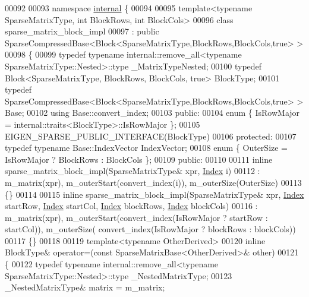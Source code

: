 \begin{DoxyCode}
00092 
00093 \textcolor{keyword}{namespace }\hyperlink{namespaceinternal}{internal} \{
00094 
00095 \textcolor{keyword}{template}<\textcolor{keyword}{typename} SparseMatrixType, \textcolor{keywordtype}{int} BlockRows, \textcolor{keywordtype}{int} BlockCols>
00096 \textcolor{keyword}{class }sparse\_matrix\_block\_impl
00097   : \textcolor{keyword}{public} SparseCompressedBase<Block<SparseMatrixType,BlockRows,BlockCols,true> >
00098 \{
00099     \textcolor{keyword}{typedef} \textcolor{keyword}{typename} internal::remove\_all<typename SparseMatrixType::Nested>::type \_MatrixTypeNested;
00100     \textcolor{keyword}{typedef} Block<SparseMatrixType, BlockRows, BlockCols, true> BlockType;
00101     \textcolor{keyword}{typedef} SparseCompressedBase<Block<SparseMatrixType,BlockRows,BlockCols,true> > Base;
00102     \textcolor{keyword}{using} Base::convert\_index;
00103 \textcolor{keyword}{public}:
00104     \textcolor{keyword}{enum} \{ IsRowMajor = internal::traits<BlockType>::IsRowMajor \};
00105     EIGEN\_SPARSE\_PUBLIC\_INTERFACE(BlockType)
00106 \textcolor{keyword}{protected}:
00107     \textcolor{keyword}{typedef} \textcolor{keyword}{typename} Base::IndexVector IndexVector;
00108     \textcolor{keyword}{enum} \{ OuterSize = IsRowMajor ? BlockRows : BlockCols \};
00109 \textcolor{keyword}{public}:
00110 
00111     \textcolor{keyword}{inline} sparse\_matrix\_block\_impl(SparseMatrixType& xpr, \hyperlink{namespace_eigen_a62e77e0933482dafde8fe197d9a2cfde}{Index} i)
00112       : m\_matrix(xpr), m\_outerStart(convert\_index(i)), m\_outerSize(OuterSize)
00113     \{\}
00114 
00115     \textcolor{keyword}{inline} sparse\_matrix\_block\_impl(SparseMatrixType& xpr, \hyperlink{namespace_eigen_a62e77e0933482dafde8fe197d9a2cfde}{Index} startRow, 
      \hyperlink{namespace_eigen_a62e77e0933482dafde8fe197d9a2cfde}{Index} startCol, \hyperlink{namespace_eigen_a62e77e0933482dafde8fe197d9a2cfde}{Index} blockRows, \hyperlink{namespace_eigen_a62e77e0933482dafde8fe197d9a2cfde}{Index} blockCols)
00116       : m\_matrix(xpr), m\_outerStart(convert\_index(IsRowMajor ? startRow : startCol)), m\_outerSize(
      convert\_index(IsRowMajor ? blockRows : blockCols))
00117     \{\}
00118 
00119     \textcolor{keyword}{template}<\textcolor{keyword}{typename} OtherDerived>
00120     \textcolor{keyword}{inline} BlockType& operator=(\textcolor{keyword}{const} SparseMatrixBase<OtherDerived>& other)
00121     \{
00122       \textcolor{keyword}{typedef} \textcolor{keyword}{typename} internal::remove\_all<typename SparseMatrixType::Nested>::type \_NestedMatrixType;
00123       \_NestedMatrixType& matrix = m\_matrix;

\end{DoxyCode}

